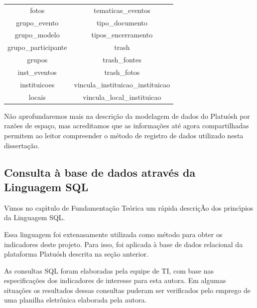 \documentclass[
12pt,		%
openright,	%
twoside,  %
a4paper,			%
chapter=TITLE,		%
english,			%
french,				%
spanish,			%
brazil				%
]{USPSC-classe/USPSC}
\begin{document}
\begin{table}[htb]
\begin{tabular}{|c|c|}
 fotos                          &   tematicas\_eventos \\
 grupo\_evento                   &   tipo\_documento \\
 grupo\_modelo                   &   tipos\_encerramento \\
 grupo\_participante             &   trash \\
 grupos                         &   trash\_fontes \\
 inst\_eventos                   &   trash\_fotos \\
 instituicoes                   &   vincula\_instituicao\_instituicao \\
 locais                         &   vincula\_local\_instituicao \\
\hline
\end{tabular}
\end{table}


N\~ao aprofundaremos mais na descri\c{c}\~ao da modelagem de dados do Platu\'osh por raz\~oes de espa\c{c}o, mas acreditamos que as informa\c{c}\~oes at\'e agora compartilhadas permitem ao leitor compreender o m\'etodo de registro de dados utilizado nesta disserta\c{c}\~ao.










\subsection[Consulta \`a base de dados atrav\'es da Linguagem SQL]{Consulta \`a base de dados atrav\'es da Linguagem SQL}\label{Consulta \`a base de dados atrav\'es da Linguagem SQL}
Vimos no cap\'{\i}tulo de Fundamenta\c{c}\~ao Te\'orica um r\'apida descri\c{c}\~Ao dos princ\'{\i}pios da Linguagem SQL.










Essa linguagem foi extenasamente utilizada como m\'etodo para obter os indicadores deste projeto. Para isso, foi aplicada \`a base de dados relacional da plataforma Platu\'osh descrita na se\c{c}\~ao anterior.










As consultas SQL foram elaboradas pela equipe de TI, com base nas especifica\c{c}\~oes dos indicadores de interesse para esta autora. Em algumas situa\c{c}\~oes os resultados dessas consultas puderam ser verificados pelo emprego de uma planilha eletr\^onica elaborada pela autora.
\end{document}
